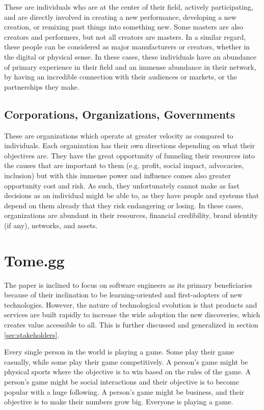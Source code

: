 \documentclass[journal, onecolumn]{IEEEtran}
\begin{document}
These are individuals who are at the center of their field, actively participating,
and are directly involved in creating a new performance, developing a new creation, 
or remixing past things into something new. Some masters are also creators and 
performers, but not all creators are masters. In a similar regard, these people can
be considered as major manufacturers or creators, whether in the digital or physical 
sense. In these cases, these individuals have an abundance of primary experience in
their field and an immense abundance in their network, by having an incredible
connection with their audiences or markets, or the partnerships they make.

\subsection{Corporations, Organizations, Governments}

These are organizations which operate at greater velocity as compared to individuals.
Each organization has their own directions depending on what their objectives are.
They have the great opportunity of funneling their resources into the causes that
are important to them (e.g. profit, social impact, advocacies, inclusion) but with
this immense power and influence comes also greater opportunity cost and risk. As
such, they unfortunately cannot make as fast decisions as an individual might be 
able to, as they have people and systems that depend on them already that they risk
endangering or losing. In these cases, organizations are abundant in their resources,
financial credibility, brand identity (if any), networks, and assets.


\section{Tome.gg}
\label{sec:tomegg}
The paper is inclined to focus on software engineers as its primary beneficiaries because of 
their inclination to be learning-oriented and  first-adopters of new technologies.
However, the nature of technological evolution is that products and services are 
built rapidly to increase the wide adoption the new discoveries, which creates value
accessible to all. This is further discussed and generalized in section \ref{sec:stakeholders}.


Every single person in the world is playing a game. Some play their game casually,
while some play their game competitively. A person's game might be physical sports
where the objective is to win based on the rules of the game. A person's game
might be social interactions and their objective is to become popular with a huge 
following. A person's game might be business, and their objective is to make their 
numbers grow big. Everyone is playing a game.
\end{document}
